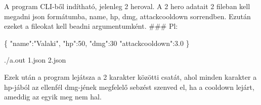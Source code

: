 A program C\+L\+I-\/ből indítható, jelenleg 2 heroval. A 2 hero adatait 2 fileban kell megadni json formátumba, name, hp, dmg, attackcooldown sorrendben. Ezután ezeket a fileokat kell beadni argumentumként. \#\#\# Pl\+: 
\begin{DoxyCode}
\{
"name":"Valaki",
"hp":50,
"dmg":30
"attackcooldown":3.0
\} 
\end{DoxyCode}
 

{\ttfamily ./a.out 1.\+json 2.\+json}

Ezek után a program lejátsza a 2 karakter közötti csatát, ahol minden karakter a hp-\/jából az ellenfél dmg-\/jének megfelelő sebzést szenved el, ha a cooldown lejárt, ameddig az egyik meg nem hal. 